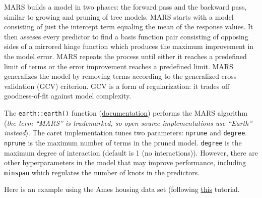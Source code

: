 \documentclass[
]{book}
\begin{document}
MARS builds a model in two phases: the forward pass and the backward pass, similar to growing and pruning of tree models. MARS starts with a model consisting of just the intercept term equaling the mean of the response values. It then asseses every predictor to find a basis function pair consisting of opposing sides of a mirrored hinge function which produces the maximum improvement in the model error. MARS repeats the process until either it reaches a predefined limit of terms or the error improvement reaches a predefined limit. MARS generalizes the model by removing terms according to the generalized cross validation (GCV) criterion. GCV is a form of regularization: it trades off goodness-of-fit against model complexity.

The \texttt{earth::earth()} function (\href{https://www.rdocumentation.org/packages/earth/versions/5.1.2/topics/earth}{documentation}) performs the MARS algorithm (\emph{the term ``MARS'' is trademarked, so open-source implementations use ``Earth'' instead}). The caret implementation tunes two parameters: \texttt{nprune} and \texttt{degree}. \texttt{nprune} is the maximum number of terms in the pruned model. \texttt{degree} is the maximum degree of interaction (default is 1 (no interactions)). However, there are other hyperparameters in the model that may improve performance, including \texttt{minspan} which regulates the number of knots in the predictors.

Here is an example using the Ames housing data set (following \href{http://uc-r.github.io/mars}{this} tutorial.
\end{document}
